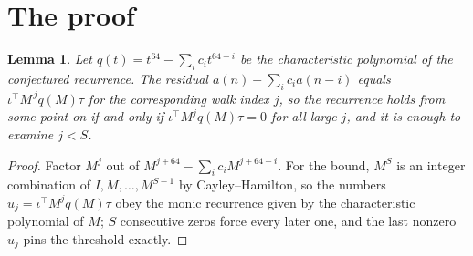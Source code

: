 \documentclass[11pt,a4paper]{article}
\theoremstyle{plain}
\newtheorem{lemma}[theorem]{Lemma}
\theoremstyle{definition}
\begin{document}
\section{The proof}

\begin{lemma}\label{lem:crit}
Let $q(t)=t^{64}-\sum_i c_it^{64-i}$ be the characteristic polynomial of the
conjectured recurrence. The residual $a(n)-\sum_ic_ia(n-i)$ equals
$\iota^{\!\top}M^{\,j}q(M)\tau$ for the corresponding walk index $j$, so the recurrence
holds from some point on if and only if $\iota^{\!\top}M^{j}q(M)\tau=0$ for all large $j$,
and it is enough to examine $j<S$.
\end{lemma}

\begin{proof}
Factor $M^{j}$ out of $M^{j+64}-\sum_ic_iM^{j+64-i}$. For the bound, $M^{S}$
is an integer combination of $I,M,\dots,M^{S-1}$ by Cayley--Hamilton, so the numbers
$u_j=\iota^{\!\top}M^{j}q(M)\tau$ obey the monic recurrence given by the characteristic
polynomial of $M$; $S$ consecutive zeros force every later one, and the last nonzero $u_j$
pins the threshold exactly.
\end{proof}
\end{document}
